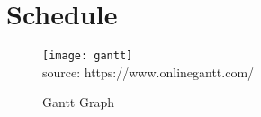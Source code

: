 \newpage
\section{Schedule}
\begin{figure}[H]
    \caption{Gantt Graph}\label{fig:gantt}
    \texttt{[image: gantt]}
    \\
    source: https://www.onlinegantt.com/
\end{figure}
